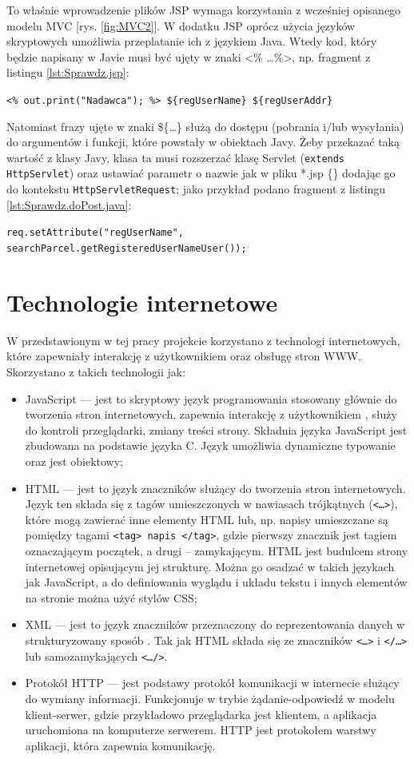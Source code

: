 \documentclass[eng,printmode,oneside]{mgr}
\begin{document}
To właśnie wprowadzenie plików JSP wymaga korzystania z wcześniej
opisanego modelu MVC [rys. \ref{fig:MVC2}]. W dodatku JSP oprócz użycia języków
skryptowych umożliwia przeplatanie ich z językiem Java. Wtedy kod, który będzie
napisany w Javie musi być ujęty w znaki <\% \ldots \%>, np. fragment z listingu
\ref{lst:Sprawdz.jsp}:

\texttt{<\% out.print("Nadawca"); \%> \$\{regUserName\}
\$\{regUserAddr\}}

Natomiast frazy ujęte w znaki \$\{\ldots\} służą do dostępu (pobrania
i/lub wysyłania) do argumentów i funkcji, które powstały w obiektach Javy. Żeby
przekazać taką wartość z klasy Javy, klasa ta musi rozszerzać klasę Servlet
(\texttt{extends HttpServlet}) oraz ustawiać parametr o nazwie jak w pliku *.jsp
\{\} dodając go do kontekstu \texttt{HttpServletRequest}; jako przykład podano
fragment z listingu \ref{lst:Sprawdz.doPost.java}:

\texttt{req.setAttribute("regUserName",
						searchParcel.getRegisteredUserNameUser());}

\section{Technologie internetowe}

W przedstawionym w tej pracy projekcie korzystano z technologi internetowych,
które zapewniały interakcję z użytkownikiem oraz obsługę stron WWW. Skorzystano
z takich technologii jak:
\begin{itemize}
  \item JavaScript --- jest to skryptowy język programowania stosowany głównie do
  tworzenia stron internetowych, zapewnia interakcję z
  użytkownikiem \cite{javascript.dev}, służy do kontroli przeglądarki, zmiany
  treści strony. Składnia języka JavaScript jest zbudowana na podstawie języka
  C. Język umożliwia dynamiczne typowanie oraz jest obiektowy;
  \item HTML --- jest to język znaczników służący do tworzenia stron
  internetowych. Język ten składa się z tagów umieszczonych w
  nawiasach trójkątnych (\texttt{<\ldots>}), które mogą zawierać inne
  elementy HTML lub, np.
  napisy umieszczane są pomiędzy tagami \texttt{<tag> napis </tag>}, gdzie
  pierwszy znacznik jest tagiem oznaczającym początek, a drugi -- zamykającym.
  HTML jest budulcem strony internetowej opisującym jej strukturę.
  Można go osadzać w takich językach jak JavaScript, a do definiowania wyglądu i
  układu tekstu i innych elementów na stronie można użyć stylów CSS;
  \item XML --- jest to język znaczników przeznaczony do reprezentowania danych w
  strukturyzowany sposób \cite{xml.wiki}. Tak jak HTML składa się ze znaczników
  \texttt{<\ldots>} i \texttt{</\ldots>} lub samozamykających
  \texttt{<\ldots/>}.
  \item Protokół HTTP --- jest podstawy protokół komunikacji w internecie służący
  do wymiany informacji. Funkcjonuje w trybie żądanie-odpowiedź w modelu
  klient-serwer, gdzie przykładowo przeglądarka jest klientem, a aplikacja
  uruchomiona na komputerze serwerem. HTTP jest protokołem warstwy aplikacji, która zapewnia komunikację.
\end{itemize}
\end{document}
